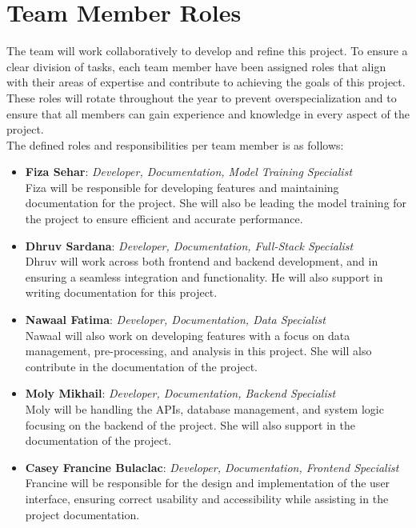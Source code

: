 \documentclass{article}
\begin{document}
\section{Team Member Roles}

The team will work collaboratively to develop and refine this project. To ensure a clear 
division of tasks, each team member have been assigned roles that 
align with their areas of expertise and contribute to achieving the goals 
of this project. These roles will rotate throughout the year to prevent overspecialization
and to ensure that all members can gain experience and knowledge in 
every aspect of the project. \\[1ex]
The defined roles and responsibilities per team member is as follows: 
\begin{itemize}
	\item \textbf{Fiza Sehar}: \textit{Developer, Documentation, Model Training Specialist} \\
	Fiza will be responsible for developing features and maintaining documentation for the 
  project. She will also be leading the model training for the project to ensure 
  efficient and accurate performance.
	\item \textbf{Dhruv Sardana}: \textit{Developer, Documentation, Full-Stack Specialist} \\
	Dhruv will work across both frontend and backend development, and in ensuring a 
  seamless integration and functionality. He will also support in writing documentation
  for this project. 
	\item \textbf{Nawaal Fatima}: \textit{Developer, Documentation, Data Specialist} \\
	Nawaal will also work on developing features with a 
  focus on data management, pre-processing, and analysis in this project. She 
  will also contribute in the documentation of the project.
	\item \textbf{Moly Mikhail}: \textit{Developer, Documentation, Backend Specialist} \\
	Moly will be handling the APIs, database management, and system logic focusing on 
  the backend of the project. She will also support in the documentation of the project.
	\item \textbf{Casey Francine Bulaclac}: \textit{Developer, Documentation, Frontend Specialist} \\
	Francine will be responsible for the design and implementation of the user interface, 
  ensuring correct usability and accessibility while assisting in the project 
  documentation.
\end{itemize}
\end{document}
